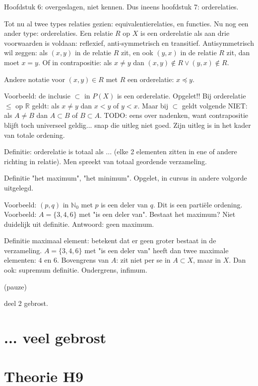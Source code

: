\documentclass{article}
\begin{document}
Hoofdstuk 6: overgeslagen, niet kennen. Dus ineens hoofdstuk 7: orderelaties. 

Tot nu al twee types relaties gezien: equivalentierelaties, en functies. Nu nog een ander type: orderelaties. Een relatie $R$ op $X$ is een orderelatie als aan drie voorwaarden is voldaan: reflexief, anti-symmetrisch en transitief. Antisymmetrisch wil zeggen: als $(x,y)$ in de relatie $R$ zit, en ook $(y,x)$ in de relatie $R$ zit, dan moet $x=y$. Of in contrapositie: als $x \neq y$ dan $(x,y) \notin R \lor (y,x) \notin R$. 

Andere notatie voor $(x,y) \in  R$ met $R$ een orderelatie: $x \preceq y$. 

Voorbeeld: de inclusie $\subset$ in $P(X)$ is een orderelatie. Opgelet!! Bij orderelatie $\leq$ op $\mathbb{R}$ geldt: als $x \neq y$ dan $x < y$ of $y < x$. Maar bij $\subset$ geldt volgende NIET: als $A \neq B$ dan $A \subset B$ of $B \subset A$. TODO: eens over nadenken, want contrapositie blijft toch universeel geldig... snap die uitleg niet goed. Zijn uitleg is in het kader van totale ordening. 

Definitie: orderelatie is totaal als ... (elke 2 elementen zitten in ene of andere richting in relatie). Men spreekt van totaal geordende verzameling. 

Definitie "het maximum", "het minimum". Opgelet, in cursus in andere volgorde uitgelegd. 

Voorbeeld: $(p,q)$ in $\mathbb{N}_0$ met $p$ is een deler van $q$. Dit is een parti\"ele ordening. Voorbeeld: $A=\{3,4,6\}$ met "is een deler van". Bestaat het maximum? Niet duidelijk uit definitie. Antwoord: geen maximum. 

Definitie maximaal element: betekent dat er geen groter bestaat in de verzameling. 
$A=\{3,4,6\}$ met "is een deler van" heeft dan twee maximale elementen: $4$ en $6$. 
Bovengrens van $A$: zit niet per se in $A \subset X$, maar in $X$. Dan ook: supremum definitie. Ondergrens, infimum. 

(pauze)

deel 2 gebrost. 

\section{... veel gebrost}


\section{Theorie H9}
\end{document}
